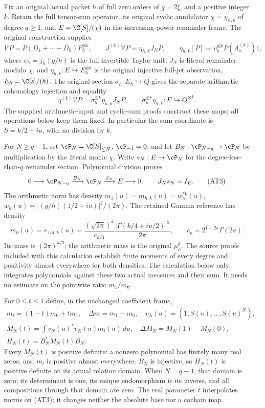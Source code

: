\documentclass[10pt,a4paper,oneside]{report}
\begin{document}
Fix an original actual packet $h$ of full zero orders of $g=2\xi$,
and a positive integer $k$. Retain the full tensor-sum operator,
its original cyclic annihilator $\chi=\chi_{h,k}$ of degree $q\ge1$,
and $E=\C[S]/(\chi)$ in the increasing-power remainder frame.
The original construction supplies
\[
 \mathcal V P=P(D_1+\cdots+D_k)F_h^{\otimes k},\qquad
 J^{(k)}\mathcal V P=\eta_{h,k}J_NP,\qquad
 \eta_{h,k}[P]=\upsilon_h^{\otimes k}P(A_h^{(k)})1,
 \tag{AT2}
\]
where $\upsilon_h=j_h(g/h)$ is the full invertible Taylor unit,
$J_N$ is literal remainder modulo $\chi$, and
$\eta_{h,k}:E\hookrightarrow E_h^{\otimes k}$ is the original
injective full-jet observation, $E_h=\C[s]/(h)$.
The original section $\sigma_h:E_h\hookrightarrow Q$ gives the
separate arithmetic cohomology injection and equality
\[
 q^{(k)}\mathcal V P=\sigma_h^{\otimes k}\eta_{h,k}J_NP,
 \qquad \sigma_h^{\otimes k}\eta_{h,k}:E\hookrightarrow Q^{\otimes k}.
 \tag{AT2a}
\]
The supplied arithmetic-input and cyclic-sum proofs construct these
maps; all operations below keep them fixed. In
particular the sum coordinate is $S=k/2+iu$, with no division by $k$.

For $N\ge q-1$, set $\cP_N=\C[S]_{\le N}$,
$\cP_{-1}=0$, and let
$B_N:\cP_{N-q}\to\cP_N$ be multiplication by the literal monic
$\chi$. Write $s_N:E\to\cP_N$ for the degree-less-than-$q$
remainder section. Polynomial division proves
\[
 0\longrightarrow\cP_{N-q}\xrightarrow{B_N}\cP_N
       \xrightarrow{J_N}E\longrightarrow0,
 \qquad J_Ns_N=I_E.                         \tag{AT3}
\]
The arithmetic norm has density
$m_1(u)=m_{h,k}(u)=w_h^{*k}(u)$,
$w_h(u)=|(g/h)(1/2+iu)|^2/(2\pi)$.
The retained Gamma reference has density
\[
 m_0(u)=r_{1/4,k}(u)
 =\frac{(\sqrt{2\pi})^k}{c_{k/4}}
       \frac{|\Gamma(k/4+iu/2)|^2}{2\pi},
 \qquad c_a=2^{1-2a}\Gamma(2a).              \tag{AT4}
\]
Its mass is $(2\pi)^{k/2}$; the arithmetic mass is the original
$\mu_h^k$. The source proofs included with this calculation establish
finite moments of every degree and positivity almost everywhere for
both densities. The calculation below only integrates polynomials
against these two actual measures and their sum. It needs no estimate
on the pointwise ratio $m_1/m_0$.

For $0\le t\le1$ define, in the unchanged coefficient frame,
\[
 \begin{gathered}
 m_t=(1-t)m_0+tm_1,\quad \Delta m=m_1-m_0,
 \quad v_N(u)=(1,S(u),\ldots,S(u)^N),\\
 M_N(t)=\int v_N(u)^*v_N(u)m_t(u)\,du,
 \quad \Delta M_N=M_N(1)-M_N(0),\\
 H_N(t)=B_N^*M_N(t)B_N.                     \tag{AT5}
 \end{gathered}
\]
Every $M_N(t)$ is positive definite: a nonzero polynomial has finitely
many real zeros, and $m_t$ is positive almost everywhere. $B_N$ is
injective, so $H_N(t)$ is positive definite on its actual relation
domain. When $N=q-1$, that domain is zero; its determinant is one,
its unique endomorphism is its inverse, and all compositions through
that domain are zero. The real parameter $t$ interpolates norms on
(AT3); it changes neither the absolute base nor a cochain map.
\end{document}
